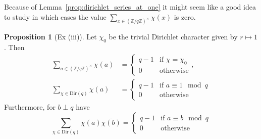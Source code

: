 \documentclass{scrartcl}
\newcommand{\Z}{\mathbb{Z}}
\newcommand{\units}{\times}
\theoremstyle{definition}
\newtheorem{proposition}[definition]{Proposition}
\begin{document}
Because of Lemma~\ref{prop:dirichlet_series_at_one} it might seem like a good idea to study in which cases the value $\sum_{x \in (\Z/q\Z)^\units} \chi(x)$ is zero.
\begin{proposition}[Ex (iii)]
    \label{prop:finite_sums_characters}
    Let $\chi_0$ be the trivial Dirichlet character given by $r \mapsto 1$.
    Then
    \begin{align*}
        \sum_{a \in (\Z/q\Z)^\units} \chi(a) &= \begin{cases}
            q - 1 & \text{if $\chi = \chi_0$} \\
            0 & \text{otherwise}
        \end{cases}, \\
        \sum_{\chi \in \mathrm{Dir}(q)} \chi(a) &= \begin{cases}
            q - 1 & \text{if $a \equiv 1 \mod q$} \\
            0 & \text{otherwise}
        \end{cases}
    \end{align*}
    Furthermore, for $b \perp q$ have
    \begin{equation*}
        \sum_{\chi \in \mathrm{Dir}(q)} \chi(a)\overline{\chi(b)} = \begin{cases}
            q - 1 & \text{if $a \equiv b \mod q$} \\
            0 & \text{otherwise}
        \end{cases}
    \end{equation*}
\end{proposition}
\end{document}
